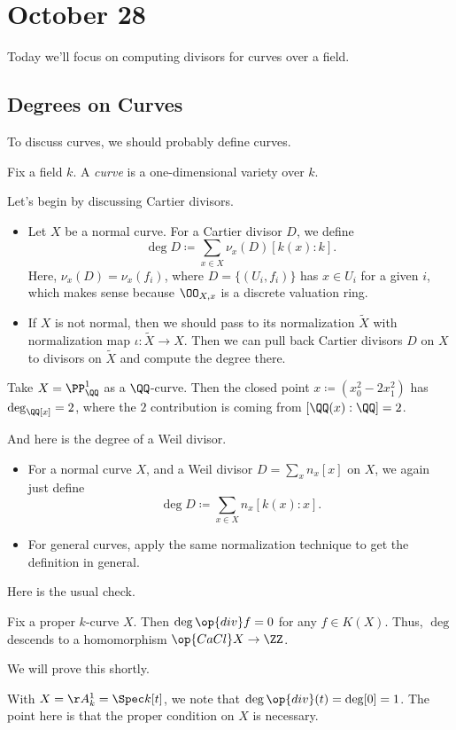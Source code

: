 \documentclass[../notes.tex]{subfiles}
\begin{document}
\section{October 28}

Today we'll focus on computing divisors for curves over a field.

\subsection{Degrees on Curves}
To discuss curves, we should probably define curves.
\begin{definition}[Curve]
	Fix a field $k$. A \textit{curve} is a one-dimensional variety over $k$.
\end{definition}
Let's begin by discussing Cartier divisors.
\begin{itemize}
	\item Let $X$ be a normal curve. For a Cartier divisor $D$, we define
	\[\deg D\coloneqq\sum_{x\in X}\nu_x(D)[k(x):k].\]
	Here, $\nu_x(D)=\nu_x(f_i)$, where $D=\{(U_i,f_i)\}$ has $x\in U_i$ for a given $i$, which makes sense because $\OO_{X,x}$ is a discrete valuation ring.
	\item If $X$ is not normal, then we should pass to its normalization $\widetilde X$ with normalization map $\iota\colon\widetilde X\to X$. Then we can pull back Cartier divisors $D$ on $X$ to divisors on $\widetilde X$ and compute the degree there.
\end{itemize}
\begin{example}
	Take $X=\PP^1_\QQ$ as a $\QQ$-curve. Then the closed point $x\coloneqq\left(x_0^2-2x_1^2\right)$ has $\deg_\QQ[x]=2$, where the $2$ contribution is coming from $[\QQ(x):\QQ]=2$.
\end{example}
And here is the degree of a Weil divisor.
\begin{itemize}
	\item For a normal curve $X$, and a Weil divisor $D=\sum_xn_x[x]$ on $X$, we again just define
	\[\deg D\coloneqq\sum_{x\in X}n_x[k(x):x].\]
	\item For general curves, apply the same normalization technique to get the definition in general.
\end{itemize}
Here is the usual check.
\begin{prop} \label{prop:deg-of-princ-vanishes}
	Fix a proper $k$-curve $X$. Then $\deg\op{div}f=0$ for any $f\in K(X)$. Thus, $\deg$ descends to a homomorphism $\op{CaCl}X\to\ZZ$.
\end{prop}
We will prove this shortly.
\begin{nex}
	With $X=\AA^1_k=\Spec k[t]$, we note that $\deg\op{div}(t)=\deg[0]=1$. The point here is that the proper condition on $X$ is necessary.
\end{nex}
\end{document}
